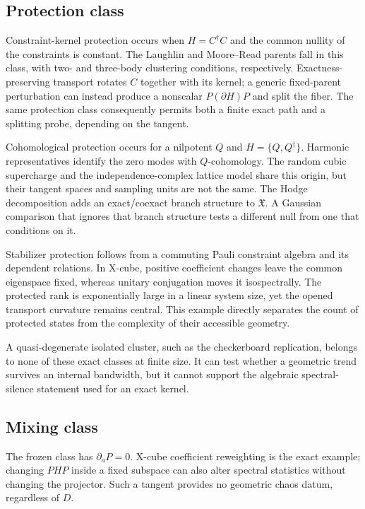 \subsection{Protection class}

Constraint-kernel protection occurs when $H=C^\dagger C$ and the common
nullity of the constraints is constant.  The Laughlin and Moore--Read parents
fall in this class, with two- and three-body clustering conditions,
respectively.  Exactness-preserving transport rotates $C$ together with its
kernel; a generic fixed-parent perturbation can instead produce a nonscalar
$P(\partial H)P$ and split the fiber.  The same protection class consequently
permits both a finite exact path and a splitting probe, depending on the
tangent.

Cohomological protection occurs for a nilpotent $Q$ and
$H=\{Q,Q^\dagger\}$.  Harmonic representatives identify the zero modes with
$Q$-cohomology.  The random cubic supercharge and the independence-complex
lattice model share this origin, but their tangent spaces and sampling units
are not the same.  The Hodge decomposition adds an exact/coexact branch
structure to $\mathfrak X$.  A Gaussian comparison that ignores that branch
structure tests a different null from one that conditions on it.

Stabilizer protection follows from a commuting Pauli constraint algebra and
its dependent relations.  In X-cube, positive coefficient changes leave the
common eigenspace fixed, whereas unitary conjugation moves it isospectrally.
The protected rank is exponentially large in a linear system size, yet the
opened transport curvature remains central.  This example directly separates
the count of protected states from the complexity of their accessible
geometry.

A quasi-degenerate isolated cluster, such as the checkerboard replication,
belongs to none of these exact classes at finite size.  It can test whether a
geometric trend survives an internal bandwidth, but it cannot support the
algebraic spectral-silence statement used for an exact kernel.

\subsection{Mixing class}

The frozen class has $\partial_aP=0$.  X-cube coefficient reweighting is the
exact example; changing $PHP$ inside a fixed subspace can also alter spectral
statistics without changing the projector.  Such a tangent provides no
geometric chaos datum, regardless of $D$.

